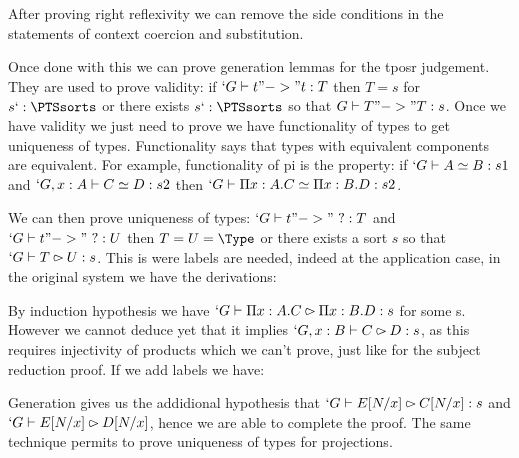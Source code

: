 \documentclass[11pt]{article}
\def\TPOSR{{\sc tposr}\xspace}
\begin{document}
After proving right reflexivity we can remove the side conditions in the
statements of context coercion and substitution.

Once done with this we can prove generation lemmas for the \TPOSR judgement.
They are used to prove validity: if $`G \type t "->" t : T$ then $T = s$
for $s `: \PTSsorts$ or there exists $s `: \PTSsorts$ so that $G \type T
"->" T : s$. Once we have validity we just need to prove we have
functionality of types to get uniqueness of types. Functionality says
that types with equivalent components are equivalent. For example,
functionality of pi is the property:
if $`G \type A \simeq B : s1$ and $`G, x : A \type C \simeq D : s2$ then
$`G \type \Pi x : A.C \simeq \Pi x : B.D : s2$.

We can then prove uniqueness of types: $`G \type t "->"~? : T$ and $`G
\type t "->"~? : U$ then $T = U = \Type$ or there exists a sort $s$ so
that $`G \type T \sub U : s$. This is were labels are needed, indeed at
the application case, in the original system we have the derivations:

\begin{prooftree}
\end{prooftree}
\begin{prooftree}
\end{prooftree}

By induction hypothesis we have $`G \type \Pi x : A.C \sub \Pi x : B.D :
s$ for some s. However we cannot deduce yet that it implies $`G, x : B
\type C \sub D : s$, as this requires injectivity of products which we
can't prove, just like for the subject reduction proof. If we add labels
we have:

\begin{prooftree}
\end{prooftree}
\begin{prooftree}
\end{prooftree}

Generation gives us the addidional hypothesis that $`G \type E[N/x] \sub
C[N/x] : s$ and $`G \type E[N/x] \sub D[N/x]$, hence we are able to
complete the proof.
The same technique permits to prove uniqueness of types for projections.
\end{document}
